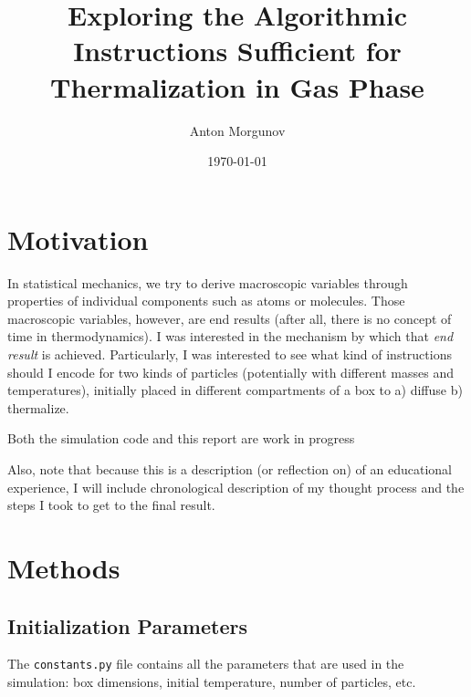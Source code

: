 \documentclass[12pt]{article}
\begin{document}
\title{Exploring the Algorithmic Instructions Sufficient for Thermalization in Gas Phase}
\author{Anton Morgunov}
\date{\today}

\maketitle



\section{Motivation}
In statistical mechanics, we try to derive macroscopic variables through properties of individual components such as atoms or molecules. Those macroscopic variables, however, are end results (after all, there is no concept of time in thermodynamics). I was interested in the mechanism by which that \textit{end result} is achieved. Particularly, I was interested to see what kind of instructions should I encode for two kinds of particles (potentially with different masses and temperatures), initially placed in different compartments of a box to a) diffuse b) thermalize. 

\begin{warningbox}
    Both the simulation code and this report are work in progress
\end{warningbox}

Also, note that because this is a description (or reflection on) of an educational experience, I will include chronological description of my thought process and the steps I took to get to the final result.

\section{Methods}
\subsection{Initialization Parameters}
The \texttt{constants.py} file contains all the parameters that are used in the simulation: box dimensions, initial temperature, number of particles, etc.
\end{document}
